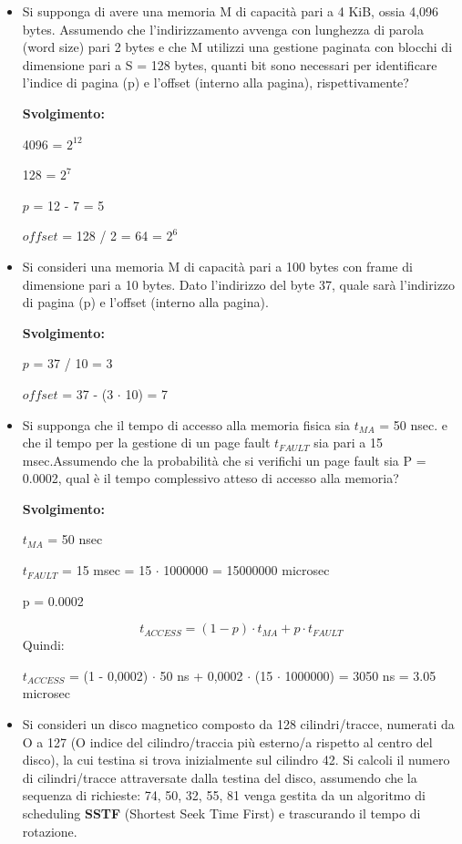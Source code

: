 \documentclass{article}
\begin{document}
\begin{itemize}
    \item Si supponga di avere una memoria M di capacità pari a 4 KiB, ossia 4,096 bytes. Assumendo che l'indirizzamento avvenga con lunghezza di parola (word size) pari 2 bytes e che M utilizzi una gestione paginata con blocchi di dimensione pari a S = 128 bytes, quanti bit sono necessari per identificare l'indice di pagina (p) e l'offset (interno alla pagina), rispettivamente?\par
    \textbf{Svolgimento:}\par
    4096 = $2^{12}$\par
    128 = $2^{7}$\par
    $p$ = 12 - 7 = 5\par
    $offset$ = 128 / 2 = 64 = $2^{6}$\par
    \item Si consideri una memoria M di capacità pari a 100 bytes con frame di dimensione pari a 10 bytes. Dato l'indirizzo del byte 37, quale sarà l'indirizzo di pagina (p) e l'offset (interno alla pagina).\par
    \textbf{Svolgimento:}\par
    $p$ = 37 / 10 = 3\par
    $offset$ = 37 - (3 $\cdot$ 10) = 7\par
    \item Si supponga che il tempo di accesso alla memoria fisica sia $t_{MA}$ = 50 nsec. e che il tempo per la gestione di un page fault $t_{FAULT}$ sia pari a 15 msec.Assumendo che la probabilità che si verifichi un page fault sia P = 0.0002, qual è il tempo complessivo atteso di accesso alla memoria?\par
    \textbf{Svolgimento:}\par
    $t_{MA}$ = 50 nsec\par
    $t_{FAULT}$ = 15 msec = 15 $\cdot$ 1000000 = 15000000 microsec\par
    p = 0.0002\par
    \begin{equation}
        t_{ACCESS} = (1 - p) \cdot t_{MA} + p \cdot t_{FAULT}
    \end{equation}
    Quindi:\par
    $t_{ACCESS}$ = (1 - 0,0002) $\cdot$ 50 ns + 0,0002 $\cdot$ (15 $\cdot$ 1000000) = 3050 ns = 3.05 microsec
    \item Si consideri un disco magnetico composto da 128 cilindri/tracce, numerati da O a 127 (O indice del cilindro/traccia più esterno/a rispetto al centro del disco), la cui testina si trova inizialmente sul cilindro 42. Si calcoli il numero di cilindri/tracce attraversate dalla testina del disco, assumendo che la sequenza di richieste: 74, 50, 32, 55, 81 venga gestita da un algoritmo di scheduling \textbf{SSTF} (Shortest Seek Time First) e trascurando il tempo di rotazione.\par

\end{itemize}
\end{document}
